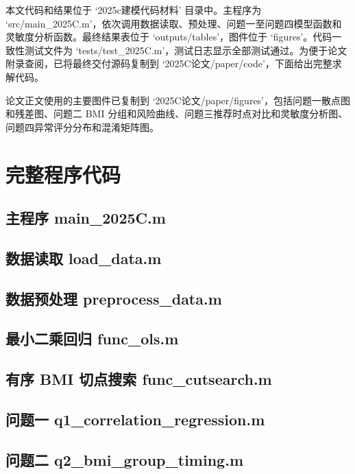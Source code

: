 \documentclass[UTF8,zihao=-4]{ctexart}
\numberwithin{equation}{section}
\begin{document}
本文代码和结果位于 `2025c建模代码材料' 目录中。主程序为 `src/main\_2025C.m'，依次调用数据读取、预处理、问题一至问题四模型函数和灵敏度分析函数。最终结果表位于 `outputs/tables'，图件位于 `figures'。代码一致性测试文件为 `tests/test\_2025C.m'，测试日志显示全部测试通过。为便于论文附录查阅，已将最终交付源码复制到 `2025C论文/paper/code'，下面给出完整求解代码。

论文正文使用的主要图件已复制到 `2025C论文/paper/figures'，包括问题一散点图和残差图、问题二 BMI 分组和风险曲线、问题三推荐时点对比和灵敏度分析图、问题四异常评分分布和混淆矩阵图。

\section{完整程序代码}

\subsection{主程序 main\_2025C.m}

\subsection{数据读取 load\_data.m}

\subsection{数据预处理 preprocess\_data.m}

\subsection{最小二乘回归 func\_ols.m}

\subsection{有序 BMI 切点搜索 func\_cutsearch.m}

\subsection{问题一 q1\_correlation\_regression.m}

\subsection{问题二 q2\_bmi\_group\_timing.m}
\end{document}
